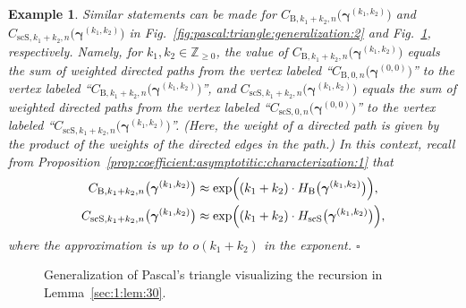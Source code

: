 \documentclass[journal,lettersize,twocolumn]{IEEEtran} %
\newtheorem{example}[theorem]{Example}
\newcommand{\eexample}{\hfill$\square$}
\newcommand{\vect}[1]{ \bm{#1} }
\newcommand{\vgam}{ \vect{\gamma} }
\newcommand{\sZ}{\mathbb{Z}}
\newcommand{\CBgen}[2]{C_{\mathrm{B},#1,#2}}
\newcommand{\CscSgen}[2]{C_{\mathrm{scS},#1,#2}}
\newcommand{\HBthe}{H_{ \mathrm{B} }}
\newcommand{\HscSthe}{H_{ \mathrm{scS} }}
\begin{document}
\begin{example}
%

  Similar statements can be made for
  $\CBgen{k_1+k_2}{n}\bigl(\vgam^{(k_1,k_2)}\bigr)$ and
  $\CscSgen{k_1+k_2}{n}\bigl(\vgam^{(k_1,k_2)}\bigr)$ in
  Fig.~\ref{fig:pascal:triangle:generalization:2} and
  Fig.~\ref{fig:pascal:triangle:generalization:3}, respectively. Namely, for
  $k_1, k_2 \in \sZ_{\geq 0}$, the value of
  $\CBgen{k_1+k_2}{n}\bigl(\vgam^{(k_1,k_2)}\bigr)$ equals the sum of weighted
  directed paths from the vertex labeled
  ``$\CBgen{0}{n}\bigl(\vgam^{(0,0)}\bigr)$'' to the vertex labeled
  ``$\CBgen{k_1+k_2}{n}\bigl(\vgam^{(k_1,k_2)}\bigr)$'', and
  $\CscSgen{k_1+k_2}{n}\bigl(\vgam^{(k_1,k_2)}\bigr)$ equals the sum of
  weighted directed paths from the vertex labeled
  ``$\CscSgen{0}{n}\bigl(\vgam^{(0,0)}\bigr)$'' to the vertex labeled
  ``$\CscSgen{k_1+k_2}{n}\bigl(\vgam^{(k_1,k_2)}\bigr)$''. (Here, the weight
  of a directed path is given by the product of the weights of the directed
  edges in the path.) In this context, recall from
  Proposition~\ref{prop:coefficient:asymptotitic:characterization:1} that
  \begin{align*}
  \CBgen{k_1+k_2}{n}\bigl(\vgam^{(k_1,k_2)}\bigr)
    &\approx
       \exp
         \Bigl(
           (k_1+k_2) \cdot \HBthe\bigl( \vgam^{(k_1,k_2)} \bigr)
         \Bigr), \\
  \CscSgen{k_1+k_2}{n}\bigl(\vgam^{(k_1,k_2)}\bigr)
    &\approx
       \exp
         \Bigl(
           (k_1+k_2) \cdot \HscSthe\bigl( \vgam^{(k_1,k_2)} \bigr)
         \Bigr),
  \end{align*}
  where the approximation is up to $o(k_1+k_2)$ in the exponent.
  \eexample
\end{example}

%

\begin{figure}
  \begin{center}
    
    \medskip
    \caption{Generalization of Pascal's triangle visualizing the recursion in
      Lemma~\ref{sec:1:lem:29:copy:2}.}
    \label{fig:pascal:triangle:generalization:1}

    \vspace{1cm}

    
    \medskip
    \caption{Generalization of Pascal's triangle visualizing the recursion in
      Lemma~\ref{sec:1:lem:15:copy:2}.}
    \medskip
    \label{fig:pascal:triangle:generalization:2}
  
    \vspace{1cm}

    
    \medskip
    \caption{Generalization of Pascal's triangle visualizing the recursion in
      Lemma~\ref{sec:1:lem:30}.}
    \medskip
    \label{fig:pascal:triangle:generalization:3}
  \end{center}
\end{figure}
\end{document}
